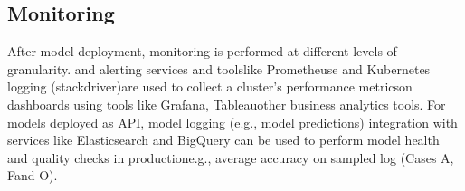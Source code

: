 \DIFdelend \subsection{Monitoring}
After model deployment, monitoring is performed at different levels of granularity. \DIFdelbegin {}\DIFdelend \DIFaddbegin {}\DIFaddend and alerting services and tools\DIFaddbegin \DIFadd{, }\DIFaddend like Prometheuse and Kubernetes logging (stackdriver)\DIFaddbegin \DIFadd{, }\DIFaddend are used to collect a cluster's performance metrics\DIFdelbegin {}\DIFdelend \DIFaddbegin {}\DIFaddend on dashboards using tools like Grafana, Tableau\DIFdelbegin {}\DIFdelend \DIFaddbegin {}\DIFaddend other business analytics tools. For models deployed as API, model logging (e.g., model predictions) integration with services like Elasticsearch and BigQuery can be used to perform model health and quality checks in production\DIFaddbegin \DIFadd{, }\DIFaddend e.g., average accuracy on sampled log (Cases A, F\DIFaddbegin \DIFadd{, }\DIFaddend and O).
\DIFdelbegin %


